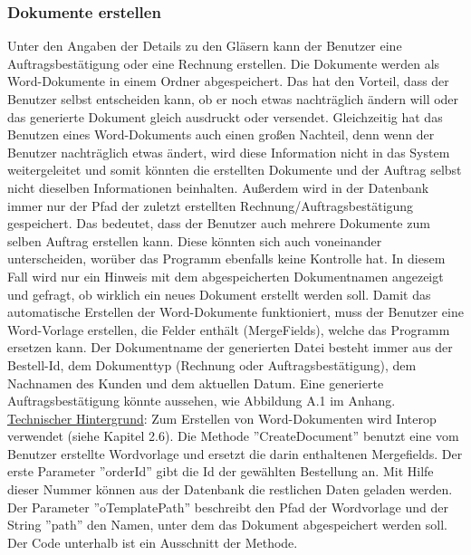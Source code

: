 \subsubsection{Dokumente erstellen}
Unter den Angaben der Details zu den Gläsern kann der Benutzer eine Auftragsbestätigung oder eine Rechnung erstellen. Die Dokumente werden als Word-Dokumente in einem Ordner abgespeichert. Das hat den Vorteil, dass der Benutzer selbst entscheiden kann, ob er noch etwas nachträglich ändern will oder das generierte Dokument gleich ausdruckt oder versendet. Gleichzeitig hat das Benutzen eines Word-Dokuments auch einen großen Nachteil, denn wenn der Benutzer nachträglich etwas ändert, wird diese Information nicht in das System weitergeleitet und somit könnten die erstellten Dokumente und der Auftrag selbst nicht dieselben Informationen beinhalten. Außerdem wird in der Datenbank immer nur der Pfad der zuletzt erstellten Rechnung/Auftragsbestätigung gespeichert. Das bedeutet, dass der Benutzer auch mehrere Dokumente zum selben Auftrag erstellen kann. Diese könnten sich auch voneinander unterscheiden, worüber das Programm ebenfalls keine Kontrolle hat. In diesem Fall wird nur ein Hinweis mit dem abgespeicherten Dokumentnamen angezeigt und gefragt, ob wirklich ein neues Dokument erstellt werden soll.
\newline Damit das automatische Erstellen der Word-Dokumente funktioniert, muss der Benutzer  eine Word-Vorlage erstellen, die Felder enthält (MergeFields), welche das Programm ersetzen kann. Der Dokumentname der generierten Datei besteht immer aus der Bestell-Id, dem Dokumenttyp (Rechnung oder Auftragsbestätigung), dem Nachnamen des Kunden und dem aktuellen Datum. 
\newline Eine generierte Auftragsbestätigung könnte aussehen, wie Abbildung A.1 im Anhang.
\newline
\noindent \underline{Technischer Hintergrund}: \linebreak
Zum Erstellen von Word-Dokumenten wird Interop verwendet (siehe Kapitel 2.6). Die Methode ''CreateDocument'' benutzt eine vom Benutzer erstellte Wordvorlage und ersetzt die darin enthaltenen Mergefields. Der erste Parameter ''orderId'' gibt die Id der gewählten Bestellung an. Mit Hilfe dieser Nummer können aus der Datenbank die restlichen Daten geladen werden. Der Parameter ''oTemplatePath'' beschreibt den Pfad der Wordvorlage und der String ''path'' den Namen, unter dem das Dokument abgespeichert werden soll. Der Code unterhalb ist ein Ausschnitt der Methode. \newpage
